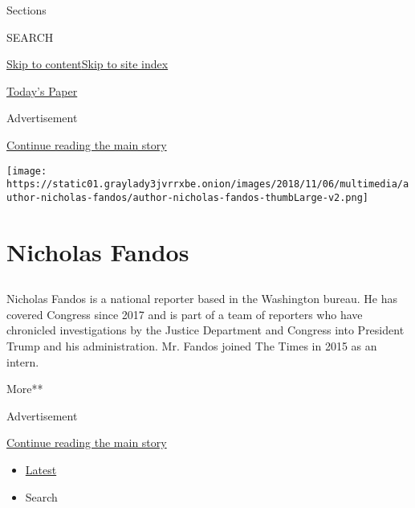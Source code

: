 Sections

SEARCH

\protect\hyperlink{site-content}{Skip to
content}\protect\hyperlink{site-index}{Skip to site index}

\href{https://myaccount.nytimes3xbfgragh.onion/auth/login?response_type=cookie\&client_id=vi}{}

\href{https://www.nytimes3xbfgragh.onion/section/todayspaper}{Today's
Paper}

Advertisement

\protect\hyperlink{after-top}{Continue reading the main story}

\texttt{[image: https://static01.graylady3jvrrxbe.onion/images/2018/11/06/multimedia/author-nicholas-fandos/author-nicholas-fandos-thumbLarge-v2.png]}

\hypertarget{nicholas-fandos}{%
\section{Nicholas Fandos}\label{nicholas-fandos}}

\subsection{}

Nicholas Fandos is a national reporter based in the Washington bureau.
He has covered Congress since 2017 and is part of a team of reporters
who have chronicled investigations by the Justice Department and
Congress into President Trump and his administration. Mr. Fandos joined
The Times in 2015 as an intern.

More**

Advertisement

\protect\hyperlink{after-mid1}{Continue reading the main story}

\begin{itemize}
\tightlist
\item
  \protect\hyperlink{stream-panel}{Latest}
\item
  Search
\end{itemize}

